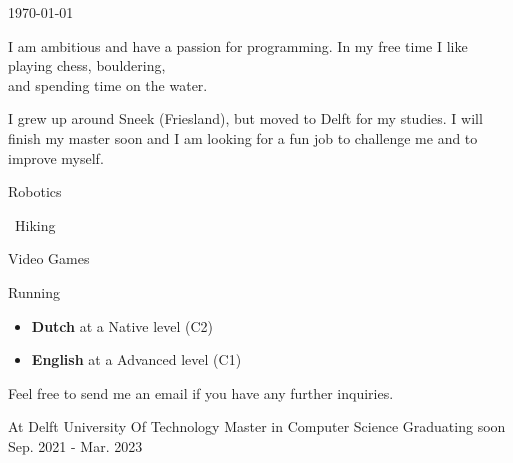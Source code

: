 \documentclass[11pt, a4paper]{awesome-cv}
\begin{document}
\makecvheader

\makecvfooter
  {\today}
  {}
  {}
  
\begin{paracol}{2}
	
	\begin{cvparagraph}
		I am ambitious and have a passion for programming. In my free time I like playing chess, bouldering, \\and spending time on the water. 
		
		I grew up around Sneek (Friesland), but moved to Delft for my studies. I will finish my master soon and I am looking for a fun job to challenge me and to improve myself.
	\end{cvparagraph}

	
	\begin{cvparagraph}
		\begin{description}[leftmargin=*]
			\item[] \faRobot \hspace*{0.1cm} Robotics
			\item[] \faHiking \hspace*{0.15cm} \, Hiking
			\item[] \faGamepad \hspace*{0.1cm} Video Games
			\item[] \faRunning \hspace*{0.20cm} Running
		\end{description}
	\end{cvparagraph}
	
	\cvsection{Languages}
	
	\begin{cvparagraph}
		\begin{itemize}[leftmargin=*]
			\item \textbf{Dutch} at a Native level (C2)
			\item \textbf{English} at a Advanced level (C1)
		\end{itemize}
	\end{cvparagraph}

	\cvsection{Contact}
	
	\begin{cvparagraph}
		Feel free to send me an email if you have any further inquiries.
	\end{cvparagraph}

	
	\switchcolumn
	
	\begin{cventries}
		\shortcventry
		{At Delft University Of Technology}
		{Master in Computer Science}
		{Graduating soon}
		{Sep. 2021 - Mar. 2023}
		

\end{cventries}
\end{paracol}
\end{document}
